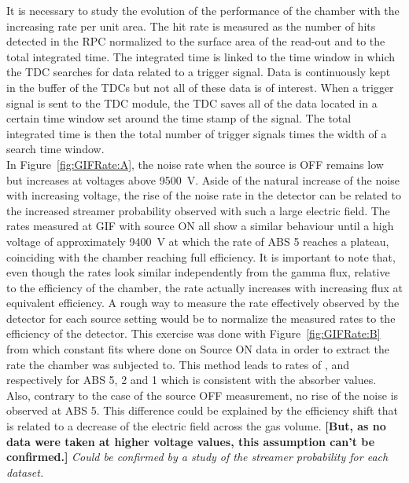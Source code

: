 	It is necessary to study the evolution of the performance of the chamber with the increasing rate per unit area. The hit rate is measured as the number of hits detected in the RPC normalized to the surface area of the read-out and to the total integrated time. The integrated time is linked to the time window in which the TDC searches for data related to a trigger signal. Data is continuously kept in the buffer of the TDCs but not all of these data is of interest. When a trigger signal is sent to the TDC module, the TDC saves all of the data located in a certain time window set around the time stamp of the signal. The total integrated time is then the total number of trigger signals times the width of a search time window.\\
	In Figure~\ref{fig:GIFRate:A}, the noise rate when the source is OFF remains low but increases at voltages above \SI{9500}{V}. Aside of the natural increase of the noise with increasing voltage, the rise of the noise rate in the detector can be related to the increased streamer probability observed with such a large electric field. The rates measured at GIF with source ON all show a similar behaviour until a high voltage of approximately \SI{9400}{V} at which the rate of ABS 5 reaches a plateau, coinciding with the chamber reaching full efficiency. It is important to note that, even though the rates look similar independently from the gamma flux, relative to the efficiency of the chamber, the rate actually increases with increasing flux at equivalent efficiency. A rough way to measure the rate effectively observed by the detector for each source setting would be to normalize the measured rates to the efficiency of the detector. This exercise was done with Figure~\ref{fig:GIFRate:B} from which constant fits where done on Source ON data in order to extract the rate the chamber was subjected to. This method leads to rates of ,  and  respectively for ABS 5, 2 and 1 which is consistent with the absorber values. Also, contrary to the case of the source OFF measurement, no rise of the noise is observed at ABS 5. This difference could be explained by the efficiency shift that is related to a decrease of the electric field across the gas volume. \textbf{[But, as no data were taken at higher voltage values, this assumption can't be confirmed.]} \textit{Could be confirmed by a study of the streamer probability for each dataset.}
	
